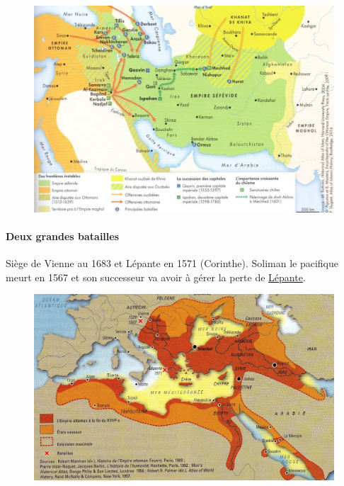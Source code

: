 \begin{figure}
    \centering
    \includegraphics[width=\textwidth]{HistoireIslamMediterranee/Images/EmpireSefevide.jpg}

    \label{fig:my_label}
\end{figure}

\paragraph{Deux grandes batailles} Siège de Vienne au 1683 et Lépante en 1571 (Corinthe). Soliman le pacifique meurt en 1567 et son successeur va avoir à gérer la perte de \href{https://fr.wikipedia.org/wiki/Bataille_de_L%C3%A9pante}{Lépante}.
\begin{figure}[h!]
    \centering
    \includegraphics[width=\textwidth]{HistoireIslamMediterranee/Images/EmpireOttomanXVIIe.jpg}

    \label{fig:my_label}
\end{figure}
